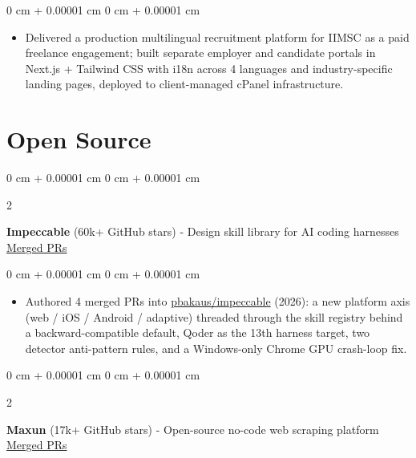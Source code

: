 \documentclass[10pt, letterpaper]{article}
\newenvironment{highlights}{
    \begin{itemize}[
        topsep=0.10 cm,
        parsep=0.10 cm,
        partopsep=0pt,
        itemsep=0pt,
        leftmargin=0 cm + 10pt
    ]
}{
    \end{itemize}
} %
\newenvironment{onecolentry}{
    \begin{adjustwidth}{
        0 cm + 0.00001 cm
    }{
        0 cm + 0.00001 cm
    }
}{
    \end{adjustwidth}
} %
\newenvironment{twocolentry}[2][]{
    \onecolentry
    \def\secondColumn{#2}
    \setcolumnwidth{\fill, 4.5 cm}
    \begin{paracol}{2}
}{
    \switchcolumn \raggedleft \secondColumn
    \end{paracol}
    \endonecolentry
} %
\begin{document}
        \vspace{0.10 cm}
        \begin{onecolentry}
            \begin{highlights}
                \item Delivered a production multilingual recruitment platform for IIMSC as a paid freelance engagement; built separate employer and candidate portals in Next.js + Tailwind CSS with i18n across 4 languages and industry-specific landing pages, deployed to client-managed cPanel infrastructure.
            \end{highlights}
        \end{onecolentry}

    \section{Open Source}

        \begin{twocolentry}{
            \href{https://github.com/pbakaus/impeccable/pulls?q=is\%3Apr+author\%3Avinaypokharkar+is\%3Amerged}{Merged PRs}
        }
            \textbf{Impeccable} (60k+ GitHub stars) - Design skill library for AI coding harnesses \end{twocolentry}

        \vspace{0.10 cm}
        \begin{onecolentry}
            \begin{highlights}
                \item Authored 4 merged PRs into \href{https://github.com/pbakaus/impeccable}{pbakaus/impeccable} (2026): a new platform axis (web / iOS / Android / adaptive) threaded through the skill registry behind a backward-compatible default, Qoder as the 13th harness target, two detector anti-pattern rules, and a Windows-only Chrome GPU crash-loop fix.
            \end{highlights}
        \end{onecolentry}

        \vspace{0.2 cm}

        \begin{twocolentry}{
            \href{https://github.com/getmaxun/maxun/pulls?q=is\%3Apr+author\%3Avinaypokharkar+is\%3Amerged}{Merged PRs}
        }
            \textbf{Maxun} (17k+ GitHub stars) - Open-source no-code web scraping platform \end{twocolentry}
\end{document}
